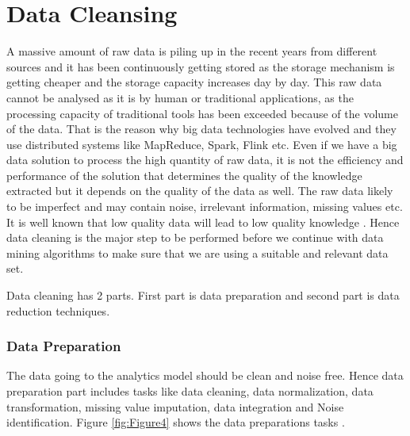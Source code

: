 \documentclass[sigconf]{acmart}
\begin{document}
\section{Data Cleansing}

A massive amount of raw data is piling up in the recent years from different sources and it has been continuously getting stored as the storage mechanism is getting cheaper and the storage capacity increases day by day. This raw data cannot be analysed as it is by human or traditional applications, as the processing capacity of traditional tools has been exceeded because of the volume of the data. That is the reason why big data technologies have evolved and they use distributed systems like MapReduce, Spark, Flink etc. Even if we have a big data solution to process the high quantity of raw data, it is not the efficiency and performance of the solution that determines the quality of the knowledge extracted but it depends on the quality of the data as well. The raw data likely to be imperfect and may contain noise, irrelevant information, missing values etc. It is well known that low quality data will lead to low quality knowledge \cite{preprocessing}. Hence data cleaning is the major step to be performed before we continue with data mining algorithms to make sure that we are using a suitable and relevant data set. 

Data cleaning has 2 parts. First part is data preparation and second part is data reduction techniques. 

\subsubsection{Data Preparation}

The data going to the analytics model should be clean and noise free. Hence data preparation part includes tasks like data cleaning, data normalization, data transformation, missing value imputation, data integration and Noise identification. Figure \ref{fig:Figure4} shows the data preparations tasks \cite{preprocessing}.
\end{document}
